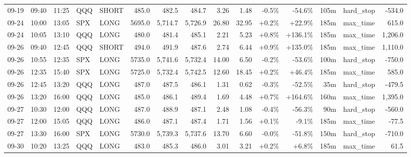 \documentclass[11pt,a4paper,twoside]{article}
\begin{document}
\begin{landscape}
\begin{center}
\begin{longtable}{>{\color{txtmain}}l l l l l r r r r r r r r >{\color{txtmain}}l r}
09-19 & 09:40 & 11:25 & QQQ & SHORT & 485.0 & 482.5 & 484.7 & 3.26 & 1.48 & \textcolor{lossred}{-0.5\%} & \textcolor{lossred}{-54.6\%} & 105m & hard\_stop & \textcolor{lossred}{-534.0} \\
09-24 & 10:00 & 13:05 & SPX & LONG & 5695.0 & 5,714.7 & 5,726.9 & 26.80 & 32.95 & \textcolor{wingreen}{+0.2\%} & \textcolor{wingreen}{+22.9\%} & 185m & max\_time & \textcolor{wingreen}{615.0} \\
09-24 & 10:05 & 13:10 & QQQ & LONG & 480.0 & 481.4 & 485.1 & 2.21 & 5.23 & \textcolor{wingreen}{+0.8\%} & \textcolor{wingreen}{+136.1\%} & 185m & max\_time & \textcolor{wingreen}{1,206.0} \\
09-26 & 09:40 & 12:45 & QQQ & SHORT & 494.0 & 491.9 & 487.6 & 2.74 & 6.44 & \textcolor{wingreen}{+0.9\%} & \textcolor{wingreen}{+135.0\%} & 185m & max\_time & \textcolor{wingreen}{1,110.0} \\
09-26 & 10:55 & 12:35 & SPX & LONG & 5735.0 & 5,741.6 & 5,732.4 & 14.00 & 6.50 & \textcolor{lossred}{-0.2\%} & \textcolor{lossred}{-53.6\%} & 100m & hard\_stop & \textcolor{lossred}{-750.0} \\
09-26 & 12:35 & 15:40 & SPX & LONG & 5725.0 & 5,732.4 & 5,742.5 & 12.60 & 18.45 & \textcolor{wingreen}{+0.2\%} & \textcolor{wingreen}{+46.4\%} & 185m & max\_time & \textcolor{wingreen}{585.0} \\
09-26 & 12:45 & 13:20 & QQQ & LONG & 487.0 & 487.5 & 486.1 & 1.31 & 0.62 & \textcolor{lossred}{-0.3\%} & \textcolor{lossred}{-52.5\%} & 35m & hard\_stop & \textcolor{lossred}{-479.5} \\
09-26 & 13:20 & 16:00 & QQQ & LONG & 485.0 & 486.1 & 489.4 & 1.69 & 4.48 & \textcolor{wingreen}{+0.7\%} & \textcolor{wingreen}{+164.6\%} & 160m & max\_time & \textcolor{wingreen}{1,395.0} \\
09-27 & 10:30 & 12:00 & QQQ & LONG & 487.0 & 488.9 & 487.1 & 2.48 & 1.08 & \textcolor{lossred}{-0.4\%} & \textcolor{lossred}{-56.3\%} & 90m & hard\_stop & \textcolor{lossred}{-560.0} \\
09-27 & 12:00 & 15:05 & QQQ & LONG & 486.0 & 487.1 & 487.4 & 1.71 & 1.56 & \textcolor{wingreen}{+0.1\%} & \textcolor{lossred}{-9.1\%} & 185m & max\_time & \textcolor{lossred}{-77.5} \\
09-27 & 13:30 & 16:00 & SPX & LONG & 5730.0 & 5,739.3 & 5,737.6 & 13.70 & 6.60 & \textcolor{lossred}{-0.0\%} & \textcolor{lossred}{-51.8\%} & 150m & hard\_stop & \textcolor{lossred}{-710.0} \\
09-30 & 10:20 & 13:25 & QQQ & LONG & 483.0 & 485.3 & 486.0 & 3.01 & 3.21 & \textcolor{wingreen}{+0.2\%} & \textcolor{wingreen}{+6.8\%} & 185m & max\_time & \textcolor{wingreen}{61.5} \\

\end{longtable}
\end{center}
\end{landscape}
\end{document}
